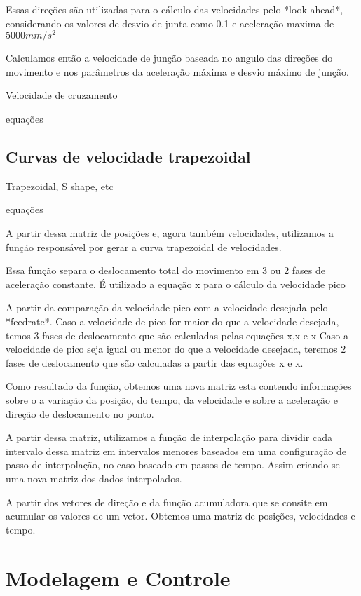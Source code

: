 Essas direções são utilizadas para o cálculo das velocidades pelo *look ahead*,
considerando os valores de desvio de junta como  0.1 e aceleração maxima de $5000 mm/s^2$

Calculamos então a velocidade de junção baseada no angulo das direções do movimento e
nos parâmetros da aceleração máxima e desvio máximo de junção.

Velocidade de cruzamento

equações


\subsection{Curvas de velocidade trapezoidal}
Trapezoidal, S shape, etc

equações


A partir dessa matriz de posições e, agora também velocidades,
utilizamos a função responsável por gerar a curva trapezoidal de velocidades.

Essa função separa o deslocamento total do movimento em 3 ou 2 fases de aceleração constante.
É utilizado a equação x para o cálculo da velocidade pico

A partir da comparação da velocidade pico com a velocidade desejada pelo *feedrate*.
Caso a velocidade de pico for maior do que a velocidade desejada, temos 3 fases de deslocamento
que são calculadas pelas equações x,x e x
Caso a velocidade de pico seja igual ou menor do que a velocidade desejada, teremos 2 fases de deslocamento
que são calculadas a partir das equações x e x.

Como resultado da função, obtemos uma nova matriz esta contendo informações
sobre o a variação da posição, do tempo, da velocidade e sobre a aceleração e direção de deslocamento no ponto.

A partir dessa matriz, utilizamos a função de interpolação para dividir cada intervalo dessa matriz em intervalos menores
baseados em uma configuração de passo de interpolação, no caso baseado em passos de tempo.
Assim criando-se uma nova matriz dos dados interpolados.

A partir dos vetores de direção e da função acumuladora que se consite em acumular os valores de um vetor.
Obtemos uma matriz de posições, velocidades e tempo.




\section{Modelagem e Controle}

